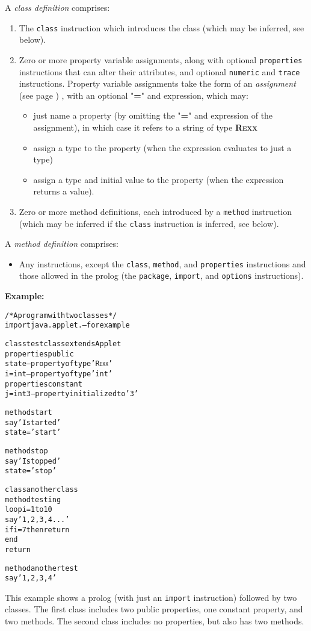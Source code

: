A \emph{class definition} comprises:
\begin{enumerate}
\item The \texttt{class} instruction which introduces the class (which may
be inferred, see below).
\item 
Zero or more property variable assignments,
along with optional \texttt{properties}
instructions that can alter their attributes, and optional
\texttt{numeric} and \texttt{trace} instructions.
Property variable assignments take the form of an
 \emph{assignment} (see page \pageref{refassign}) , with an optional
"\textbf{=}" and expression, which may:
\begin{itemize}
\item just name a property (by omitting the "\textbf{=}"
and expression of the assignment), in which case it refers to a string of
type \textbf{R\textsc{exx}}
\item assign a type to the property (when the expression evaluates to just
a type)
\item 
assign a type and initial value to the property (when the expression
returns a value).
\end{itemize}
\item Zero or more method definitions, each introduced by a
\texttt{method} instruction (which may be inferred if the \texttt{class}
instruction is inferred, see below).
\end{enumerate}
 
A \emph{method definition} comprises:
\begin{itemize}
\item 
Any \nr{} instructions, except the \texttt{class}, \texttt{method},
and \texttt{properties} instructions and those allowed in the prolog
(the \texttt{package}, \texttt{import}, and \texttt{options}
instructions).
\end{itemize}
 \textbf{Example:}
\begin{alltt}
/* A program with two classes */
import java.applet.   -- for example

class testclass extends Applet
  properties public
    state             -- property of type 'R\textsc{exx}'
    i=int             -- property of type 'int'
  properties constant
    j=int 3           -- property initialized to '3'

  method start
    say 'I started'
    state='start'

  method stop
    say 'I stopped'
    state='stop'

class anotherclass
  method testing
    loop i=1 to 10
      say '1, 2, 3, 4...'
      if i=7 then return
     end
    return

  method anothertest
    say '1, 2, 3, 4'
\end{alltt}
This example shows a prolog (with just an \texttt{import}
instruction) followed by two classes.  The first class includes
two public properties, one constant property, and two methods.
The second class includes no properties, but also has two methods.
 
